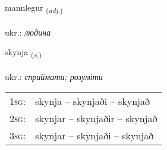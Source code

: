 \documentclass[frontgrid, backgrid]{flacards}\usepackage[]{graphicx}\usepackage[]{xcolor}
\begin{document}
\renewcommand{\flhead}{\vskip5pt \fboxsep=0pt {\small\bfseries\footnotesize Lýsingarorð | прикметник}}
\renewcommand{\fcfoot}{\vskip5pt \fboxsep=0pt \hspace{2pt}{\small\bfseries\footnotesize 2K}}

\renewcommand{\blhead}{\vskip5pt {\small\bfseries\footnotesize Lýsingarorð | прикметник }}
\renewcommand{\bcfoot}{\vskip5pt \hspace{2pt}{\small\bfseries\footnotesize 2K}}


{mannlegur \small{\textsubscript{(\textit{adj.})}} \\[1ex] %
\textphonetic{[manlɛɣʏr]} \\
ukr.: \emph{людина} \\  [2ex]
\renewcommand*{\arraystretch}{0.8}
}

\renewcommand{\flhead}{\vskip5pt \fboxsep=0pt {\small\bfseries\footnotesize Sagnorð | дієслово}}
\renewcommand{\fcfoot}{\vskip5pt \fboxsep=0pt \hspace{2pt}{\small\bfseries\footnotesize 2K}}

\renewcommand{\blhead}{\vskip5pt {\small\bfseries\footnotesize Sagnorð | дієслово }}
\renewcommand{\bcfoot}{\vskip5pt \hspace{2pt}{\small\bfseries\footnotesize 2K}}


{skynja \small{\textsubscript{(\textit{v.})}} \\[1ex] %
\textphonetic{[scɪnja]} \\
ukr.: \emph{сприймати; розуміти} \\  [2ex]
\renewcommand*{\arraystretch}{0.8}
\begin{tabular}{p{1cm}l}
\textsc{1sg}: & skynja -- skynjaði -- skynjað \\ 
\textsc{2sg}: & skynjar -- skynjaðir -- skynjað \\ 
\textsc{3sg}: & skynjar -- skynjaði -- skynjað \\ 
\end{tabular}
}
\end{document}
